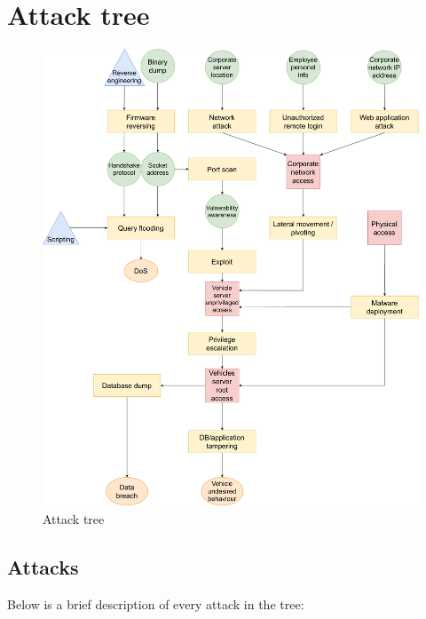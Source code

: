 %
\chapter{Attack tree}\label{ch:attackTree}


\begin{figure}[H]
    \begin{center}
        \includegraphics[scale=0.4]{img/attackTree.pdf}
        \caption{Attack tree}
        \label{fig:attackTree}
    \end{center}
    \vspace*{-0.4cm}
\end{figure}


\section{Attacks}
Below is a brief description of every attack in the tree:

